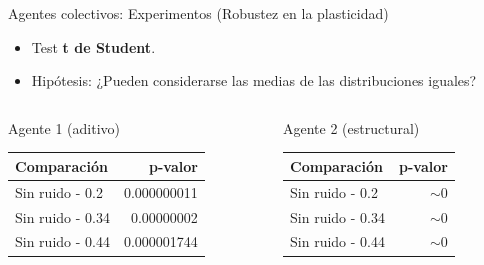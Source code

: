 \documentclass[aspectratio=169]{beamer}
\begin{document}
\begin{frame}{Agentes colectivos: Experimentos (Robustez en la plasticidad)}
  \begin{itemize}
    \item Test \textbf{t de Student}.
    \item Hipótesis: ¿Pueden considerarse las medias de las distribuciones iguales?
  \end{itemize}
  \begin{columns}
    \begin{column}{0.47\textwidth}
      \begin{block}{Agente 1 (aditivo)}
        \begin{table}
         \begin{tabular}{lr}
           \toprule
           Comparación & p-valor\\
           \midrule
           Sin ruido - 0.2 & 0.000000011\\
           Sin ruido - 0.34 & 0.00000002\\
           Sin ruido - 0.44 & 0.000001744\\
           \bottomrule
         \end{tabular}
       \end{table}
    \end{block}
    \end{column}
    \begin{column}{0.5\textwidth}
      \begin{block}{Agente 2 (estructural)}
        \begin{table}
         \begin{tabular}{lr}
           \toprule
           Comparación & p-valor\\
           \midrule
           Sin ruido - 0.2 & $\sim 0$\\
           Sin ruido - 0.34 & $\sim 0$\\
           Sin ruido - 0.44 & $\sim 0$\\
           \bottomrule
         \end{tabular}
       \end{table}
      \end{block}
    \end{column}
  \end{columns}
\end{frame}
\end{document}
